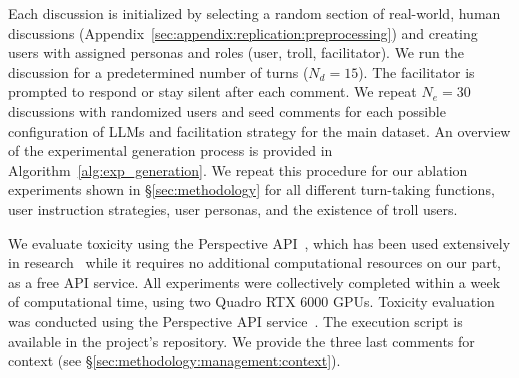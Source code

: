 Each discussion is initialized by selecting a random section of real-world, human discussions (Appendix~\ref{sec:appendix:replication:preprocessing}) and creating users with assigned personas and roles (user, troll, facilitator). We run the discussion for a predetermined number of turns ($N_d=15$). The facilitator is prompted to respond or stay silent after each comment. We repeat $N_e=30$ discussions with randomized users and seed comments for each possible configuration of LLMs and facilitation strategy for the main dataset. An overview of the experimental generation process is provided in Algorithm~\ref{alg:exp_generation}. We repeat this procedure for our ablation experiments shown in \S\ref{sec:methodology} for all different turn-taking functions, user instruction strategies, user personas, and the existence of troll users.

We evaluate toxicity using the Perspective API~\cite{google_perspective_api}, which has been used extensively in research~\cite{pozzobon-etal-2023-challenges} while it requires no additional computational resources on our part, as a free API service. All experiments were collectively completed within a week of computational time, using two Quadro RTX 6000 GPUs. Toxicity evaluation was conducted using the Perspective API service~\cite{google_perspective_api}. The execution script is available in the project's repository. We provide the three last comments for context (see \S\ref{sec:methodology:management:context}).